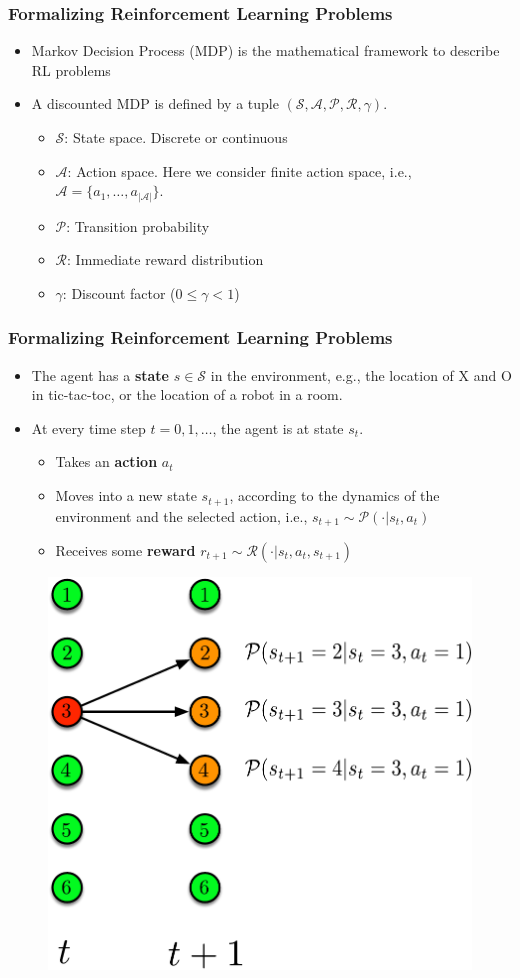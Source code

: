 \documentclass[handout]{beamer}
\newcommand{\States}{\mathcal{S}}
\newcommand{\Actions}{\mathcal{A}}
\newcommand{\PKernel}{\mathcal{P}}
\newcommand{\RKernel}{\mathcal{R}}
\renewcommand{\high}{\textbf}
\begin{document}
\begin{frame}\frametitle{Formalizing Reinforcement Learning Problems}\small
\begin{itemize}
\item Markov Decision Process (MDP) is the mathematical framework to describe RL problems
\item A discounted MDP is defined by a tuple $(\States, \Actions, \PKernel, \RKernel, \gamma)$.
\begin{itemize}
	\item $\States$: State space. Discrete or continuous
	\item $\Actions$: Action space. Here we consider finite action space, i.e., $\Actions = \{a_1, \dotsc, a_{|\Actions|} \}$.
	\item $\PKernel$: Transition probability
	\item $\RKernel$: Immediate reward distribution
	\item $\gamma$: Discount factor ($0 \leq \gamma < 1$)
\end{itemize}
\end{itemize}

\end{frame}


\begin{frame}\frametitle{Formalizing Reinforcement Learning Problems}\small
\begin{itemize}
\item The agent has a \high{state} $s \in \mathcal{S}$ in the environment, e.g., the location of X and O in tic-tac-toc, or the location of a robot in a room.
\item At every time step $t = 0, 1, \dotsc$, the agent is at state $s_t$.
	\begin{itemize}
	\item Takes an \high{action} $a_t$
	\item Moves into a new state $s_{t+1}$, according to the dynamics of the environment and the selected action, i.e., $s_{t+1} \sim \PKernel(\cdot|s_t, a_t)$
	\item Receives some \high{reward} $r_{t+1} \sim \RKernel(\cdot|s_t, a_t, s_{t+1})$
	\end{itemize}
\end{itemize}

\begin{figure}
\includegraphics[width=0.3\linewidth]{Figures/MDP_transition}
\end{figure}

\end{frame}
\end{document}
